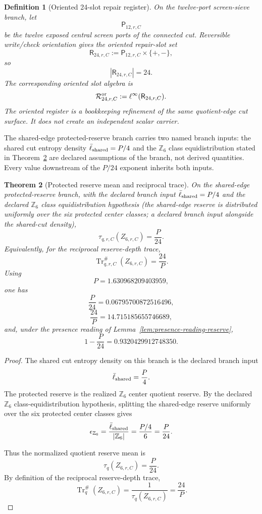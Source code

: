 \documentclass[11pt]{article}
\newtheorem{theorem}{Theorem}[section]
\newtheorem{definition}[theorem]{Definition}
\theoremstyle{remark}
\theoremstyle{plain}
\begin{document}
\begin{definition}[Oriented 24-slot repair register]
\label{def:oriented-24-slot-register}
On the twelve-port screen-sieve branch, let
\[
\mathsf P_{12,r,C}
\]
be the twelve exposed central screen ports of the connected cut. Reversible
write/check orientation gives the oriented repair-slot set
\[
\mathsf R_{24,r,C}
:=
\mathsf P_{12,r,C}\times\{+,-\},
\]
so
\[
|\mathsf R_{24,r,C}|=24.
\]
The corresponding oriented slot algebra is
\[
\mathcal R^{\rm or}_{24,r,C}
:=
\ell^\infty(\mathsf R_{24,r,C}).
\]
The oriented register is a bookkeeping refinement of the same quotient-edge cut
surface. It does not create an independent scalar carrier.
\end{definition}

The shared-edge protected-reserve branch carries two named branch inputs: the shared cut entropy
density \(\bar\ell_{\rm shared}=P/4\) and the \(\mathbb Z_6\) class equidistribution stated in
Theorem~\ref{thm:z6-reserve-trace} are declared assumptions of the branch, not derived
quantities. Every value downstream of the \(P/24\) exponent inherits both inputs.

\begin{theorem}[Protected reserve mean and reciprocal trace]
\label{thm:z6-reserve-trace}
On the shared-edge protected-reserve branch, with the declared branch input
\(\bar\ell_{\rm shared}=P/4\) and the declared \(\mathbb Z_6\) class
equidistribution hypothesis (the shared-edge reserve is distributed uniformly
over the six protected center classes; a declared branch input alongside the
shared-cut density),
\[
\boxed{
\tau_{q,r,C}(Z_{6,r,C})=\frac{P}{24}.
}
\]
Equivalently, for the reciprocal reserve-depth trace,
\[
\boxed{
\operatorname{Tr}^{\#}_{q,r,C}(Z_{6,r,C})=\frac{24}{P}.
}
\]
Using
\[
P=1.630968209403959,
\]
one has
\[
\frac{P}{24}=0.06795700872516496,
\]
\[
\frac{24}{P}=14.715185655746689,
\]
and, under the presence reading of
Lemma~\ref{lem:presence-reading-reserve},
\[
1-\frac{P}{24}=0.9320429912748350.
\]
\end{theorem}

\begin{proof}
The shared cut entropy density on this branch is the declared branch input
\[
\bar\ell_{\rm shared}=\frac{P}{4}.
\]
The protected reserve is the realized \(\mathbb Z_6\) center quotient reserve.
By the declared \(\mathbb Z_6\) class-equidistribution hypothesis, splitting
the shared-edge reserve uniformly over the six protected center classes gives
\[
\epsilon_{\mathbb Z_6}
=
\frac{\bar\ell_{\rm shared}}{|\mathbb Z_6|}
=
\frac{P/4}{6}
=
\frac{P}{24}.
\]

Thus the normalized quotient reserve mean is
\[
\tau_q(Z_{6,r,C})=\frac{P}{24}.
\]
By definition of the reciprocal reserve-depth trace,
\[
\operatorname{Tr}^{\#}_q(Z_{6,r,C})
=
\frac{1}{\tau_q(Z_{6,r,C})}
=
\frac{24}{P}.
\]
\end{proof}
\end{document}
